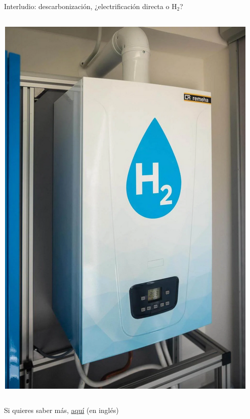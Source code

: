 \documentclass[aspectratio=169, xcolor={usenames,svgnames,dvipsnames}]{beamer}
\begin{document}
\begin{frame}{Interludio: \hspace{3mm}descarbonización, ¿electrificación directa o $\textrm{H}_2$?}
\begin{columns}
\begin{column}{0.4\columnwidth}
\begin{center}
            \includegraphics[height=0.7\textheight]{../figs/H2_boiler.png}
        \end{center}
    \end{column}
    \end{columns}
    \vspace{2mm}
    Si quieres saber más, \href{https://raw.githubusercontent.com/badber/Miscellany/master/GFC_Clean_Electrification-Future_Focus_2022.pdf}{aquí} (en inglés)
\end{frame}
\end{document}
